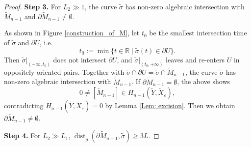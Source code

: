 \documentclass[11pt,letterpaper]{amsart}
\numberwithin{equation}{section}
\theoremstyle{definition}
\DeclareMathOperator{\dist}{dist}
\newcommand{\ve}{\varepsilon}
\newcommand{\ti}[1]{\tilde{#1}}
\begin{document}
\begin{proof}
\medskip
\noindent
{\bf Step 3.} For $L_{2}\gg1$, the curve $\ti{\sigma}$ has non-zero algebraic intersection with $\ti{M}_{n-1}$ and $\partial\ti{M}_{n-1}\neq\emptyset$.
\medskip

As shown in Figure \ref{construction_of_M}, let $t_{0}$ be the smallest intersection time of $\ti{\sigma}$ and $\partial U$, i.e.
\[
t_{0} := \min\{t\in\mathbb{R}\mid\ti{\sigma}(t)\in\partial U \}.
\]
Then $\ti{\sigma}|_{(-\infty,t_{0})}$ does not intersect $\partial U$, and $\ti{\sigma}|_{(t_{0},+\infty)}$ leaves and re-enters $U$ in oppositely oriented pairs. Together with $\ti{\sigma}\cap\partial U=\ti{\sigma}\cap\ti{M}_{n-1}$, the curve $\ti{\sigma}$ has non-zero algebraic intersection with $\ti{M}_{n-1}$. If $\partial\ti{M}_{n-1}=\emptyset$, the above shows
\[
0 \neq [\ti{M}_{n-1}] \in H_{n-1}(\ti{Y},\ti{X}_\ve),
\]
contradicting $H_{n-1}(\ti{Y},\ti{X}_\ve) = 0$ by Lemma \ref{Lem: excision}. Then we obtain $\partial\ti{M}_{n-1}\neq\emptyset$.

\medskip
\noindent
{\bf Step 4.} For $L_{2}\gg L_{1}$, $\dist_{\ti{g}}(\partial\ti{M}_{n-1},\ti{\sigma})\geq 3L$.
\medskip


\end{proof}
\end{document}
